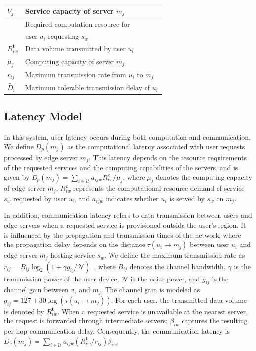 \documentclass[10pt, conference, letterpaper]{IEEEtran}
\begin{document}
\begin{table}[!t]
\begin{tabular}{|>{\centering\arraybackslash}m{2cm}|>{\raggedright\arraybackslash}m{6cm}|}
    $V_j$ & Service capacity of server $m_j$ \\ \hline
    \multirow{2}{*}{$R^{\textbf{c}}_{iw}$} & Required computation resource for \\ 
    & user $u_i$ requesting $s_w$ \\ \hline
    $R^{\textbf{t}}_{iw}$ & Data volume transmitted by user $u_i$ \\ \hline
    $\mu_j$ & Computing capacity of server $m_j$ \\ \hline
    $r_{ij}$ & Maximum transmission rate from $u_i$ to $m_j$ \\ \hline
    $\widetilde{D_i}$ & Maximum tolerable transmission delay of $u_i$ \\ \hline
\end{tabular}
\end{table}

\subsection{Latency Model}

In this system, user latency occurs during both computation and communication. We define $D_{p}(m_j)$ as the computational latency associated with user requests processed by edge server $m_j$. This latency depends on the resource requirements of the requested services and the computing capabilities of the servers, and is given by $D_{p}(m_j)=\sum_{i\in\mathcal{U}}a_{ijw}R^{\textbf{c}}_{iw}/\mu_j$, where $\mu_j$ denotes the computing capacity of edge server $m_j$, $R^{\textbf{c}}_{iw}$ represents the computational resource demand of service $s_w$ requested by user $u_i$, and $a_{ijw}$ indicates whether $u_i$ is served by $s_w$ on $m_j$.



In addition, communication latency refers to data transmission between users and edge servers when a requested service is provisioned outside the user's region. It is influenced by the propagation and transmission times of the network, where the propagation delay depends on the distance $\tau(u_i\rightarrow m_j)$ between user $u_i$ and edge server $m_j$ hosting service $s_w$. We define the maximum transmission rate as $r_{ij}=B_{ij}\log_2\!\left(1+\gamma g_{ij}/\mathcal{N}\right)$~\cite{b28,b31,b32}, where $B_{ij}$ denotes the channel bandwidth, $\gamma$ is the transmission power of the user device, $\mathcal{N}$ is the noise power, and $g_{ij}$ is the channel gain between $u_i$ and $m_j$. The channel gain is modeled as $g_{ij}=127+30\log\!\left(\tau(u_i\rightarrow m_j)\right)$. For each user, the transmitted data volume is denoted by $R^{\textbf{t}}_{iw}$. When a requested service is unavailable at the nearest server, the request is forwarded through intermediate servers; $\beta_{iw}$ captures the resulting per-hop communication delay. Consequently, the communication latency is $D_c(m_j)=\sum_{i\in\mathcal{U}}a_{ijw}(R^{\textbf{t}}_{iw}/r_{ij})\beta_{iw}$.
\end{document}

